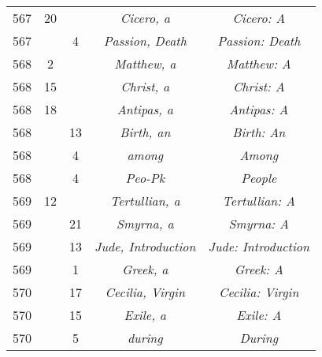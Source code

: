 \documentclass[a4paper,11pt]{article}
\begin{document}
\begin{center}
\begin{tabular}{|c|c|c|c|c|}
    567 & 20 & & \emph{Cicero, a} & \emph{Cicero: A} \\
    567 & &  4 & \emph{Passion, Death} & \emph{Passion: Death} \\
    568 &  2 & & \emph{Matthew, a} & \emph{Matthew: A} \\
    568 & 15 & & \emph{Christ, a} & \emph{Christ: A} \\
    568 & 18 & & \emph{Antipas, a} & \emph{Antipas: A} \\
    568 & & 13 & \emph{Birth, an} & \emph{Birth: An} \\
    568 & &  4 & \emph{among} & \emph{Among} \\
    568 & &  4 & \emph{Peo-Pk} & \emph{People} \\
    569 & 12 & & \emph{Tertullian, a} & \emph{Tertullian: A} \\
    569 & & 21 & \emph{Smyrna, a} & \emph{Smyrna: A} \\
    569 & & 13 & \emph{Jude, Introduction} & \emph{Jude: Introduction} \\
    569 & &  1 & \emph{Greek, a} & \emph{Greek: A} \\
    570 & & 17 & \emph{Cecilia, Virgin} & \emph{Cecilia: Virgin} \\
    570 & & 15 & \emph{Exile, a} & \emph{Exile: A} \\
    570 & &  5 & \emph{during} & \emph{During} \\
    \hline
  \end{tabular}



\end{center}
\end{document}
